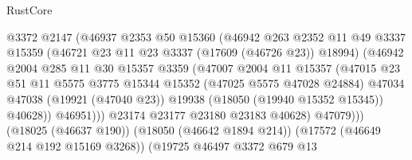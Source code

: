 \begin{lexlean}{RustCore}
\begin{coremodule}
                                  @3372
                                  @2147
                                  (@46937
                                    @2353
                                    @50
                                    @15360
                                    (@46942
                                      @263
                                      @2352
                                      @11
                                      @49
                                      @3337
                                      @15359
                                      (@46721 @23 @11 @23 @3337 (@17609 (@46726 @23)) @18994)
                                      (@46942
                                        @2004
                                        @285
                                        @11
                                        @30
                                        @15357
                                        @3359
                                        (@47007
                                          @2004
                                          @11
                                          @15357
                                          (@47015
                                            @23
                                            @51
                                            @11
                                            @5575
                                            @3775
                                            @15344
                                            @15352
                                            (@47025 @5575 @47028 @24884)
                                            @47034
                                            @47038
                                            (@19921 (@47040 @23))
                                            @19938
                                            (@18050 (@19940 @15352 @15345))
                                            @40628))
                                        @46951)))
                                  @23174
                                  @23177
                                  @23180
                                  @23183
                                  @40628)
                                @47079)))
                          (@18025 (@46637 @190))
                          (@18050 (@46642 @1894 @214))
                          (@17572 (@46649 @214 @192 @15169 @3268))
                          (@19725
                            @46497
                            @3372
                            @679
                            @13

\end{coremodule}
\end{lexlean}

